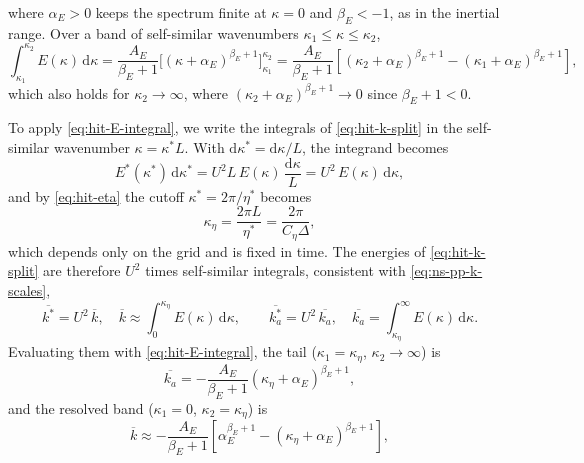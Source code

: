 \documentclass{article}
\begin{document}
where $\alpha_E > 0$ keeps the spectrum finite at $\kappa = 0$ and
$\beta_E < -1$, as in the inertial range. Over a band of self-similar
wavenumbers $\kappa_1 \le \kappa \le \kappa_2$,
\begin{equation}\label{eq:hit-E-integral}
  \int_{\kappa_1}^{\kappa_2} E(\kappa)\, \mathrm{d}\kappa
  = \frac{A_E}{\beta_E + 1}
  \Big[ (\kappa + \alpha_E)^{\beta_E + 1} \Big]_{\kappa_1}^{\kappa_2}
  = \frac{A_E}{\beta_E + 1}
  \left[ (\kappa_2 + \alpha_E)^{\beta_E + 1} - (\kappa_1 + \alpha_E)^{\beta_E + 1} \right] ,
\end{equation}
which also holds for $\kappa_2 \to \infty$, where
$(\kappa_2 + \alpha_E)^{\beta_E + 1} \to 0$ since $\beta_E + 1 < 0$.
\par
To apply \eqref{eq:hit-E-integral}, we write the integrals of
\eqref{eq:hit-k-split} in the self-similar wavenumber $\kappa = \kappa^* L$.
With $\mathrm{d}\kappa^* = \mathrm{d}\kappa / L$, the integrand becomes
\begin{equation}
  E^*(\kappa^*)\, \mathrm{d}\kappa^*
  = U^2 L\, E(\kappa)\, \frac{\mathrm{d}\kappa}{L}
  = U^2\, E(\kappa)\, \mathrm{d}\kappa ,
\end{equation}
and by \eqref{eq:hit-eta} the cutoff $\kappa^* = 2\pi/\eta^*$ becomes
\begin{equation}\label{eq:hit-kappa-eta}
  \kappa_\eta = \frac{2\pi L}{\eta^*} = \frac{2\pi}{C_\eta \Delta} ,
\end{equation}
which depends only on the grid and is fixed in time. The energies of
\eqref{eq:hit-k-split} are therefore $U^2$ times self-similar integrals,
consistent with \eqref{eq:ns-pp-k-scales},
\begin{equation}\label{eq:hit-k-split-ss}
  \overline{k^*} = U^2\, \overline{k},
  \quad
  \overline{k} \approx \int_0^{\kappa_\eta} E(\kappa)\, \mathrm{d}\kappa ,
  \qquad
  \overline{k_a^*} = U^2\, \overline{k_a},
  \quad
  \overline{k_a} = \int_{\kappa_\eta}^{\infty} E(\kappa)\, \mathrm{d}\kappa .
\end{equation}
Evaluating them with \eqref{eq:hit-E-integral}, the tail
($\kappa_1 = \kappa_\eta$, $\kappa_2 \to \infty$) is
\begin{equation}\label{eq:hit-ka}
  \overline{k_a} = -\frac{A_E}{\beta_E + 1}\left(\kappa_\eta + \alpha_E\right)^{\beta_E + 1} ,
\end{equation}
and the resolved band ($\kappa_1 = 0$, $\kappa_2 = \kappa_\eta$) is
\begin{equation}\label{eq:hit-k-resolved}
  \overline{k} \approx -\frac{A_E}{\beta_E + 1}
  \left[ \alpha_E^{\beta_E + 1} - (\kappa_\eta + \alpha_E)^{\beta_E + 1} \right] ,
\end{equation}
\end{document}
